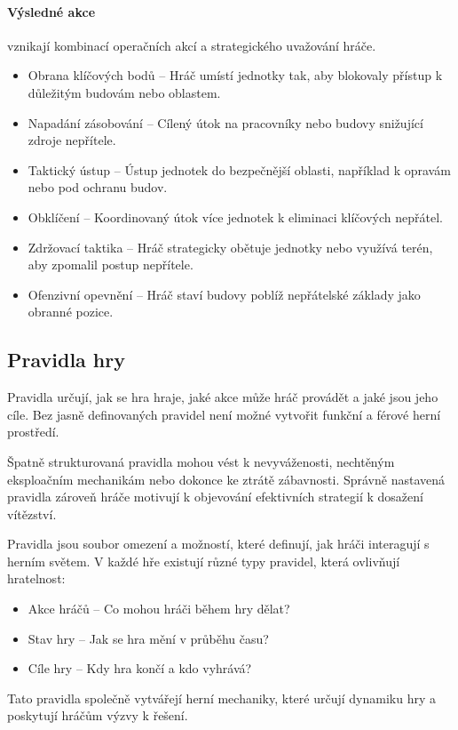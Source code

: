 \paragraph{Výsledné akce} vznikají kombinací operačních akcí a strategického uvažování hráče.
\begin{itemize}
    \item Obrana klíčových bodů -- Hráč umístí jednotky tak, aby blokovaly přístup k důležitým budovám nebo oblastem.
    \item Napadání zásobování -- Cílený útok na pracovníky nebo budovy snižující zdroje nepřítele.
    \item Taktický ústup -- Ústup jednotek do bezpečnější oblasti, například k opravám nebo pod ochranu budov.
    \item Obklíčení -- Koordinovaný útok více jednotek k eliminaci klíčových nepřátel.
    \item Zdržovací taktika -- Hráč strategicky obětuje jednotky nebo využívá terén, aby zpomalil postup nepřítele.
    \item Ofenzivní opevnění -- Hráč staví budovy poblíž nepřátelské základy jako obranné pozice.
\end{itemize}


\subsection{Pravidla hry}

Pravidla určují, jak se hra hraje, jaké akce může hráč provádět a jaké jsou jeho cíle. Bez jasně definovaných pravidel není možné vytvořit funkční a férové herní prostředí.

Špatně strukturovaná pravidla mohou vést k nevyváženosti, nechtěným eksploačním mechanikám nebo dokonce ke ztrátě zábavnosti. Správně nastavená pravidla zároveň hráče motivují k objevování efektivních strategií k dosažení vítězství.


Pravidla jsou soubor omezení a možností, které definují, jak hráči interagují s herním světem. V každé hře existují různé typy pravidel, která ovlivňují hratelnost:

\begin{itemize}
    \item Akce hráčů -- Co mohou hráči během hry dělat?
    \item Stav hry -- Jak se hra mění v průběhu času?
    \item Cíle hry -- Kdy hra končí a kdo vyhrává?
\end{itemize}
Tato pravidla společně vytvářejí herní mechaniky, které určují dynamiku hry a poskytují hráčům výzvy k řešení.

